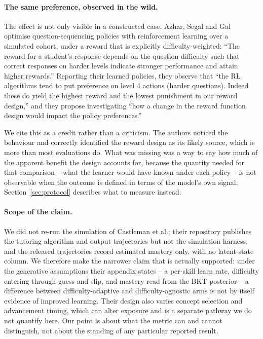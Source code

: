 \documentclass[notitlepage,12pt]{jedm}
\begin{document}
\paragraph{The same preference, observed in the wild.} The effect is not only visible in a constructed case. Azhar, Segal and Gal~\cite{azhar2022optimizing} optimise question-sequencing policies with reinforcement learning over a simulated cohort, under a reward that is explicitly difficulty-weighted: ``The reward for a student's response depends on the question difficulty such that correct responses on harder levels indicate stronger performance and attain higher rewards.'' Reporting their learned policies, they observe that ``the RL algorithms tend to put preference on level 4 actions (harder questions). Indeed these do yield the highest reward and the lowest punishment in our reward design,'' and they propose investigating ``how a change in the reward function design would impact the policy preferences.''

We cite this as a credit rather than a criticism. The authors noticed the behaviour and correctly identified the reward design as its likely source, which is more than most evaluations do. What was missing was a way to say how much of the apparent benefit the design accounts for, because the quantity needed for that comparison -- what the learner would have known under each policy -- is not observable when the outcome is defined in terms of the model's own signal. Section~\ref{sec:protocol} describes what to measure instead.

\paragraph{Scope of the claim.} We did not re-run the simulation of Castleman et al.; their repository publishes the tutoring algorithm and output trajectories but not the simulation harness, and the released trajectories record estimated mastery only, with no latent-state column. We therefore make the narrower claim that is actually supported: under the generative assumptions their appendix states -- a per-skill learn rate, difficulty entering through guess and slip, and mastery read from the BKT posterior -- a difference between difficulty-adaptive and difficulty-agnostic arms is not by itself evidence of improved learning. Their design also varies concept selection and advancement timing, which can alter exposure and is a separate pathway we do not quantify here. Our point is about what the metric can and cannot distinguish, not about the standing of any particular reported result.
\end{document}
